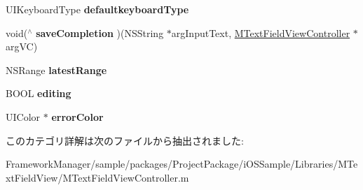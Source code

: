 \begin{DoxyCompactItemize}
\item 
\hypertarget{category_m_text_field_view_controller_07_08_a1c6add940a8de2a42448219a416c8757}{}U\+I\+Keyboard\+Type {\bfseries defaultkeyboard\+Type}\label{category_m_text_field_view_controller_07_08_a1c6add940a8de2a42448219a416c8757}

\item 
\hypertarget{category_m_text_field_view_controller_07_08_ae92d2d51111f250860f27b8a33033c00}{}void($^\wedge$ {\bfseries save\+Completion} )(N\+S\+String $\ast$arg\+Input\+Text, \hyperlink{interface_m_text_field_view_controller}{M\+Text\+Field\+View\+Controller} $\ast$arg\+V\+C)\label{category_m_text_field_view_controller_07_08_ae92d2d51111f250860f27b8a33033c00}

\item 
\hypertarget{category_m_text_field_view_controller_07_08_ac4bc6e4e85e8473e7f77f0d970ea4d25}{}N\+S\+Range {\bfseries latest\+Range}\label{category_m_text_field_view_controller_07_08_ac4bc6e4e85e8473e7f77f0d970ea4d25}

\item 
\hypertarget{category_m_text_field_view_controller_07_08_adb73f3b8da042de5a8efee8e6e8de2be}{}B\+O\+O\+L {\bfseries editing}\label{category_m_text_field_view_controller_07_08_adb73f3b8da042de5a8efee8e6e8de2be}

\item 
\hypertarget{category_m_text_field_view_controller_07_08_af5b3c4b7292d2957a1323b18381e3710}{}U\+I\+Color $\ast$ {\bfseries error\+Color}\label{category_m_text_field_view_controller_07_08_af5b3c4b7292d2957a1323b18381e3710}

\end{DoxyCompactItemize}


このカテゴリ詳解は次のファイルから抽出されました\+:\begin{DoxyCompactItemize}
\item 
Framework\+Manager/sample/packages/\+Project\+Package/i\+O\+S\+Sample/\+Libraries/\+M\+Text\+Field\+View/M\+Text\+Field\+View\+Controller.\+m\end{DoxyCompactItemize}
